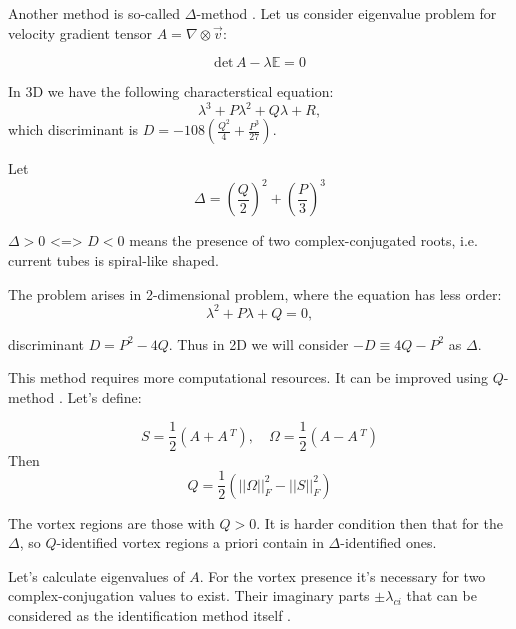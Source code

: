 \documentclass{article}
\begin{document}
Another method is so-called $\Delta$-method \cite{vortex}. Let us consider eigenvalue problem for velocity gradient tensor $A=\nabla\otimes  \vec v$:


\begin{equation}
  \text{det} \, A -\lambda \mathbb E=0
\end{equation}  

In 3D we have the following characterstical equation: $$\lambda^3+P\lambda^2+Q\lambda+R,$$ \noindent which discriminant is $D=-108\left( \frac{Q^2}{4} +\frac{P^3}{27}\right)$. 


Let $$\Delta=\left(\frac{Q}{2}\right)^2 +\left(\frac{P}{3}\right)^3$$

$ \Delta > 0 $ <=> $D<0$ means the presence of two complex-conjugated roots, i.e. current tubes is spiral-like shaped.

The problem arises in 2-dimensional problem, where the equation has less order:
$$\lambda^2+P\lambda+Q=0,$$

discriminant $D=P^2-4Q$. Thus in 2D we will consider $-D\equiv 4Q-P^2$ as $\Delta$.

This method requires more computational resources. It can be improved using $Q$-method \cite{vortex}\cite{Hussain}. Let's define:

\begin{equation}
 S=\frac{1}{2}\left(A +A\,^T \right) ,\quad \Omega=\frac{1}{2} \left( A - A\,^T\right) 
  \label{NSdim}
\end{equation}
Then
\begin{equation}
  Q=\frac{1}{2} \left( ||\Omega||^2_F-||S||^2_F \right) 
 \end{equation}

The vortex regions are those with $Q>0$. It is harder condition then that for the $\Delta$, so $Q$-identified vortex regions a priori contain in $\Delta$-identified ones.

Let's calculate eigenvalues of $A$. For the vortex presence it's necessary for two complex-conjugation values to exist. Their imaginary parts $\pm\lambda_{ci}$ that can be considered as the identification method itself \cite{vortex}.
\end{document}
